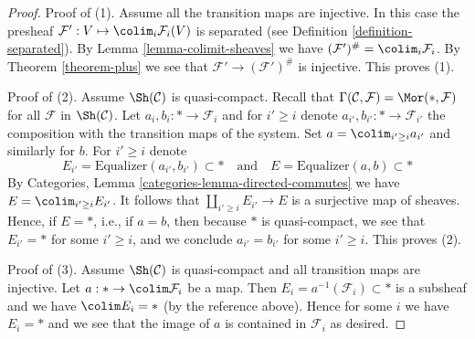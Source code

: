 \begin{proof}
Proof of (1). Assume all the transition maps are injective.
In this case the presheaf
$\mathcal{F}' : V \mapsto \colim_i \mathcal{F}_i(V)$ is
separated (see Definition \ref{definition-separated}).
By Lemma \ref{lemma-colimit-sheaves}
we have
$(\mathcal{F}')^\# = \colim_i \mathcal{F}_i$.
By Theorem \ref{theorem-plus}
we see that $\mathcal{F}' \to (\mathcal{F}')^\#$ is injective.
This proves (1).

\medskip\noindent
Proof of (2). Assume $\Sh(\mathcal{C})$ is quasi-compact. Recall that
$\Gamma(\mathcal{C}, \mathcal{F}) = \Mor(*, \mathcal{F})$
for all $\mathcal{F}$ in $\Sh(\mathcal{C})$.
Let $a_i, b_i : * \to \mathcal{F}_i$ and for
$i' \geq i$ denote $a_{i'}, b_{i'} : * \to \mathcal{F}_{i'}$
the composition with the transition maps of the system.
Set $a = \colim_{i' \geq i} a_{i'}$ and similarly for $b$.
For $i' \geq i$ denote
$$
E_{i'} = \text{Equalizer}(a_{i'}, b_{i'}) \subset *
\quad\text{and}\quad
E = \text{Equalizer}(a, b) \subset *
$$
By Categories, Lemma \ref{categories-lemma-directed-commutes} we have
$E = \colim_{i' \geq i} E_{i'}$. It follows that
$\coprod_{i' \geq i} E_{i'} \to E$
is a surjective map of sheaves. Hence, if $E = *$, i.e., if $a = b$,
then because $*$ is quasi-compact, we see that $E_{i'} = *$ for some
$i' \geq i$, and we conclude $a_{i'} = b_{i'}$ for some $i' \geq i$.
This proves (2).

\medskip\noindent
Proof of (3). Assume $\Sh(\mathcal{C})$ is quasi-compact and all
transition maps are injective. Let $a : * \to \colim \mathcal{F}_i$
be a map. Then $E_i = a^{-1}(\mathcal{F}_i) \subset *$ is a subsheaf
and we have $\colim E_i = *$ (by the reference above). Hence for
some $i$ we have $E_i = *$ and we see that the image of $a$ is
contained in $\mathcal{F}_i$ as desired.


\end{proof}
